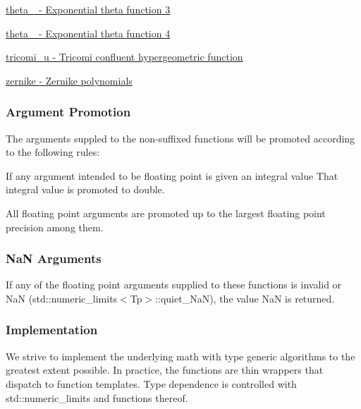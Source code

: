 \begin{DoxyItemize}
\item \hyperlink{group__mathsf__gnu_ga146c3b8e86991e164d4bf143cda5f0fc}{theta\+\_ -\/ Exponential theta function 3}
\item \hyperlink{group__mathsf__gnu_ga8a6f8b69272a9f205a13e1745832ada3}{theta\+\_ -\/ Exponential theta function 4}
\item \hyperlink{group__mathsf__gnu_gaf51a13fad85006e4d65c5b117e49f7d8}{tricomi\+\_\+u -\/ Tricomi confluent hypergeometric function}
\item \hyperlink{group__mathsf__gnu_gaaed33f29c1eb1d2c5b9590fe2e57151c}{zernike -\/ Zernike polynomials}
\end{DoxyItemize}\hypertarget{group__mathsf_mathsf_promotion}{}\subsubsection{Argument Promotion}\label{group__mathsf_mathsf_promotion}
The arguments suppled to the non-\/suffixed functions will be promoted according to the following rules\+:
\begin{DoxyEnumerate}
\item If any argument intended to be floating point is given an integral value That integral value is promoted to double.
\item All floating point arguments are promoted up to the largest floating point precision among them.
\end{DoxyEnumerate}\hypertarget{group__mathsf_mathsf_NaN}{}\subsubsection{Na\+N Arguments}\label{group__mathsf_mathsf_NaN}
If any of the floating point arguments supplied to these functions is invalid or NaN (std\+::numeric\+\_\+limits$<$\+Tp$>$\+::quiet\+\_\+\+NaN), the value NaN is returned.\hypertarget{group__mathsf_mathsf_impl}{}\subsubsection{Implementation}\label{group__mathsf_mathsf_impl}
We strive to implement the underlying math with type generic algorithms to the greatest extent possible. In practice, the functions are thin wrappers that dispatch to function templates. Type dependence is controlled with std\+::numeric\+\_\+limits and functions thereof.

